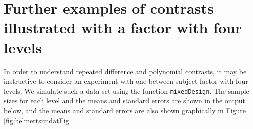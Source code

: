 \documentclass[12pt,]{krantz}
\newenvironment{Shaded}{\begin{snugshade}}{\end{snugshade}}
\newcommand{\CommentTok}[1]{\textcolor[rgb]{0.56,0.35,0.01}{\textit{#1}}}
\newcommand{\DataTypeTok}[1]{\textcolor[rgb]{0.13,0.29,0.53}{#1}}
\newcommand{\DecValTok}[1]{\textcolor[rgb]{0.00,0.00,0.81}{#1}}
\newcommand{\KeywordTok}[1]{\textcolor[rgb]{0.13,0.29,0.53}{\textbf{#1}}}
\newcommand{\NormalTok}[1]{#1}
\newcommand{\OperatorTok}[1]{\textcolor[rgb]{0.81,0.36,0.00}{\textbf{#1}}}
\newcommand{\OtherTok}[1]{\textcolor[rgb]{0.56,0.35,0.01}{#1}}
\newcommand{\StringTok}[1]{\textcolor[rgb]{0.31,0.60,0.02}{#1}}
\theoremstyle{definition}
\theoremstyle{definition}
\theoremstyle{definition}
\theoremstyle{remark}
\begin{document}
\hypertarget{further-examples-of-contrasts-illustrated-with-a-factor-with-four-levels}{%
\section{Further examples of contrasts illustrated with a factor with four levels}\label{further-examples-of-contrasts-illustrated-with-a-factor-with-four-levels}}

In order to understand repeated difference and polynomial contrasts, it may be instructive to consider an experiment with one between-subject factor with four levels.
We simulate such a data-set using the function \texttt{mixedDesign}.
The sample sizes for each level and the means and standard errors are shown in the output below, and the means and standard errors are also shown graphically in Figure \ref{fig:helmertsimdatFig}.

\begin{Shaded}
\end{Shaded}
\end{document}

